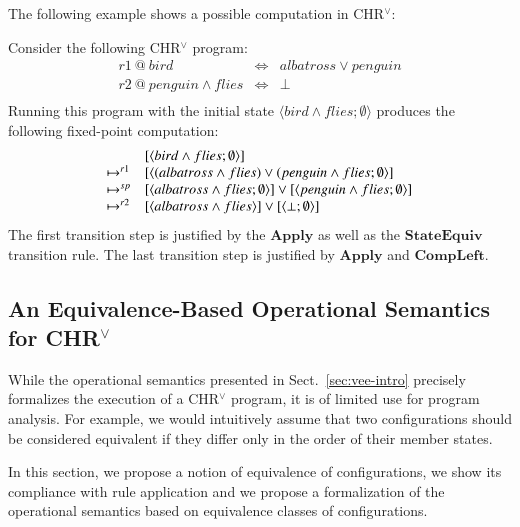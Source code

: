 \documentclass[acmtocl]{acmtrans2m}
\newcommand\state[1]{\langle #1 \rangle}
\newcommand{\chrv}{CHR$^\vee$}
\begin{document}
\noindent The following example shows a possible computation in \chrv:

\begin{example}
	\label{example:albatross}
Consider the following CHR$^\vee$ program:
\[
  \begin{array}{lcl}
    r1\ @\ bird & \Leftrightarrow & albatross \vee penguin\\
    r2\ @\ penguin\wedge flies & \Leftrightarrow & \bot\\
  \end{array}
\]
Running this program with the initial state $\state{bird\wedge
flies;\emptyset}$ produces the following fixed-point computation:
\[
  \begin{array}{ l l}
    &	[\state{bird\wedge flies;\emptyset}]\\
    \mapsto^{r1} & [\state{(albatross\wedge flies) \vee (penguin\wedge flies;\emptyset}]\\
    \mapsto^{sp} &
    [\state{albatross\wedge flies;\emptyset}] \vee
        [\state{penguin\wedge flies;\emptyset}]\\
    \mapsto^{r2} & [\state{albatross\wedge flies}] \vee
        [\state{\bot;\emptyset}]\\
  \end{array}
\]
The first transition step is justified by the $\textbf{Apply}$ as well as the
$\textbf{StateEquiv}$ transition rule. The last transition step is justified by $\textbf{Apply}$ and
$\textbf{CompLeft}$.
\end{example}

\subsection{An Equivalence-Based Operational Semantics for CHR$^\vee$}
\label{sec:vee-oesq}

While the operational semantics presented in Sect.~\ref{sec:vee-intro}
precisely formalizes the execution of a CHR$^\vee$ program, it is of limited use
for program analysis. For example, we would intuitively assume that two
configurations should be considered equivalent if they differ only in the order of
their member states.

In this section, we propose a notion of equivalence of configurations, we show
its compliance with rule application and we propose a formalization of the
operational semantics based on equivalence classes of configurations.
\end{document}
